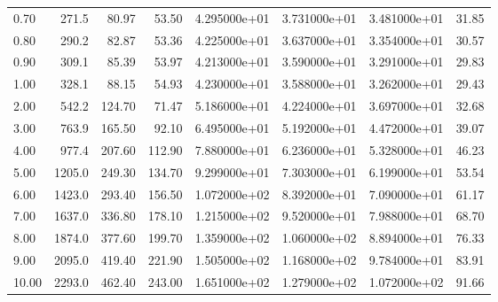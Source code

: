 \begin{tabular}{lrrrrrrr}
0.70  &     271.5 &       80.97 &        53.50 &  4.295000e+01 &  3.731000e+01 &  3.481000e+01 &       31.85 \\
0.80  &     290.2 &       82.87 &        53.36 &  4.225000e+01 &  3.637000e+01 &  3.354000e+01 &       30.57 \\
0.90  &     309.1 &       85.39 &        53.97 &  4.213000e+01 &  3.590000e+01 &  3.291000e+01 &       29.83 \\
1.00  &     328.1 &       88.15 &        54.93 &  4.230000e+01 &  3.588000e+01 &  3.262000e+01 &       29.43 \\
2.00  &     542.2 &      124.70 &        71.47 &  5.186000e+01 &  4.224000e+01 &  3.697000e+01 &       32.68 \\
3.00  &     763.9 &      165.50 &        92.10 &  6.495000e+01 &  5.192000e+01 &  4.472000e+01 &       39.07 \\
4.00  &     977.4 &      207.60 &       112.90 &  7.880000e+01 &  6.236000e+01 &  5.328000e+01 &       46.23 \\
5.00  &    1205.0 &      249.30 &       134.70 &  9.299000e+01 &  7.303000e+01 &  6.199000e+01 &       53.54 \\
6.00  &    1423.0 &      293.40 &       156.50 &  1.072000e+02 &  8.392000e+01 &  7.090000e+01 &       61.17 \\
7.00  &    1637.0 &      336.80 &       178.10 &  1.215000e+02 &  9.520000e+01 &  7.988000e+01 &       68.70 \\
8.00  &    1874.0 &      377.60 &       199.70 &  1.359000e+02 &  1.060000e+02 &  8.894000e+01 &       76.33 \\
9.00  &    2095.0 &      419.40 &       221.90 &  1.505000e+02 &  1.168000e+02 &  9.784000e+01 &       83.91 \\
10.00 &    2293.0 &      462.40 &       243.00 &  1.651000e+02 &  1.279000e+02 &  1.072000e+02 &       91.66 \\
\bottomrule
\end{tabular}
